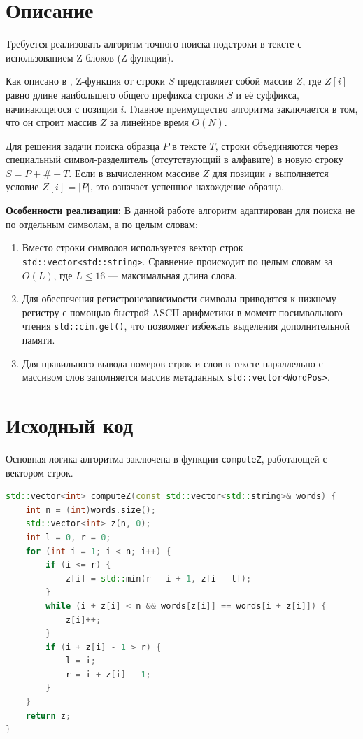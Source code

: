 \section{Описание}
Требуется реализовать алгоритм точного поиска подстроки в тексте с использованием Z-блоков (Z-функции). 

Как описано в \cite{Gasfield}, Z-функция от строки $S$ представляет собой массив $Z$, где $Z[i]$ равно длине наибольшего общего префикса строки $S$ и её суффикса, начинающегося с позиции $i$. Главное преимущество алгоритма заключается в том, что он строит массив $Z$ за линейное время $O(N)$. 

Для решения задачи поиска образца $P$ в тексте $T$, строки объединяются через специальный символ-разделитель (отсутствующий в алфавите) в новую строку $S = P + \# + T$. Если в вычисленном массиве $Z$ для позиции $i$ выполняется условие $Z[i] = |P|$, это означает успешное нахождение образца.

\textbf{Особенности реализации:}
В данной работе алгоритм адаптирован для поиска не по отдельным символам, а по целым словам:
\begin{enumerate}
\item Вместо строки символов используется вектор строк \texttt{std::vector<std::string>}. Сравнение происходит по целым словам за $O(L)$, где $L \le 16$ — максимальная длина слова.
\item Для обеспечения регистронезависимости символы приводятся к нижнему регистру с помощью быстрой ASCII-арифметики в момент посимвольного чтения \texttt{std::cin.get()}, что позволяет избежать выделения дополнительной памяти.
\item Для правильного вывода номеров строк и слов в тексте параллельно с массивом слов заполняется массив метаданных \texttt{std::vector<WordPos>}.
\end{enumerate}

\section{Исходный код}
Основная логика алгоритма заключена в функции \texttt{computeZ}, работающей с вектором строк. 

\begin{lstlisting}[language=C++]
std::vector<int> computeZ(const std::vector<std::string>& words) {
    int n = (int)words.size();
    std::vector<int> z(n, 0);
    int l = 0, r = 0;
    for (int i = 1; i < n; i++) {
        if (i <= r) {
            z[i] = std::min(r - i + 1, z[i - l]);
        }
        while (i + z[i] < n && words[z[i]] == words[i + z[i]]) {
            z[i]++;
        }
        if (i + z[i] - 1 > r) {
            l = i;
            r = i + z[i] - 1;
        }
    }
    return z;
}
\end{lstlisting}


